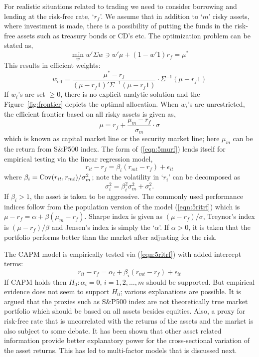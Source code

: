 For realistic situations related to trading we need to consider borrowing and lending at the risk-free rate, `$r_f$'. We assume that in addition to `$m$' risky assets, where investment is made, there is a possibility of putting the funds in the risk-free assets such as treasury bonds or CD's etc. The optimization problem can be stated as,
	\begin{equation}\label{eqn:5min2}
	\min_w w' \Sigma w \ni w'\mu + (1-w'1) r_f = \mu^*
	\end{equation}
This results in efficient weights:
	\begin{equation}\label{eqn:5weff2}
	w_{\text{eff}}= \dfrac{\mu^* - r_f}{(\mu - r_f1)' \Sigma^{-1}(\mu - r_f 1)} \cdot \Sigma^{-1}(\mu - r_f1)
	\end{equation}
If $w_i$'s are set $\geq 0$, there is no explicit analytic solution and the Figure~\ref{fig:frontier} depicts the optimal allocation. When $w_i$'s are unrestricted, the efficient frontier based on all risky assets is given as, 
	\begin{equation}\label{eqn:5murf}
	\mu= r_f + \dfrac{\mu_m - r_f}{\sigma_m} \cdot \sigma
	\end{equation}
which is known as capital market line or the security market line; here $\mu_m$ can be the return from S\&P500 index. The form of (\ref{eqn:5murf}) lends itself for empirical testing via the linear regression model,
	\begin{equation}\label{eqn:5ritrf}
	r_{it} - r_f = \beta_i (r_{mt} - r_f) + \epsilon_{it}
	\end{equation}
where $\beta_i=\operatorname{Cov}(r_{it},r_{mt})/\sigma_m^2$; note the volatility in `$r_i$' can be decomposed as 
	\begin{equation}\label{eqn:5sigsq}
	\sigma_i^2= \beta_i^2 \sigma_m^2 + \sigma_\epsilon^2.
	\end{equation}
If $\beta_i>1$, the asset is taken to be aggressive. The commonly used performance indices follow from the population version of the model (\ref{eqn:5ritrf}) which is $\mu - r_f = \alpha + \beta(\mu_m - r_f)$. Sharpe index is given as $(\mu- r_f)/\sigma$, Treynor's index is $(\mu- r_f)/\beta$ and Jensen's index is simply the `$\alpha$'. If $\alpha>0$, it is taken that the portfolio performs better than the market after adjusting for the risk. 


The CAPM model is empirically tested via (\ref{eqn:5ritrf}) with added intercept terms:
	\begin{equation}\label{eqn:intercept}
	r_{it} - r_f = \alpha_i + \beta_i (r_{mt} - r_f) + \epsilon_{it}
	\end{equation}
If CAPM holds then $H_0: \alpha_i=0$, $i=1,2,\ldots,m$ should be supported. But empirical evidence does not seem to support $H_0$; various explanations are possible. It is argued that the proxies such as S\&P500 index are not theoretically true market portfolio which should be based on all assets besides equities. Also, a proxy for risk-free rate that is uncorrelated with the returns of the assets and the market is also subject to some debate. It has been shown that other asset related information provide better explanatory power for the cross-sectional variation of the asset returns. This has led to multi-factor models that is discussed next. 


